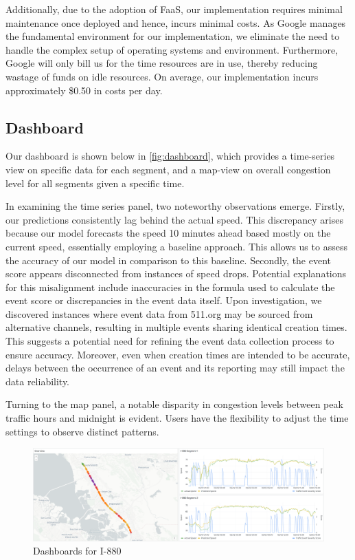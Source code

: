 Additionally, due to the adoption of FaaS, our implementation requires minimal maintenance once deployed and hence, incurs minimal costs. As Google manages the fundamental environment for our implementation, we eliminate the need to handle the complex setup of operating systems and environment. Furthermore, Google will only bill us for the time resources are in use, thereby reducing wastage of funds on idle resources. On average, our implementation incurs approximately \$0.50 in costs per day.

\subsection{Dashboard}
 Our dashboard is shown below in  \autoref{fig:dashboard}, which provides a time-series view on specific data for each segment, and a map-view on overall congestion level for all segments given a specific time.

In examining the time series panel, two noteworthy observations emerge. Firstly, our predictions consistently lag behind the actual speed. This discrepancy arises because our model forecasts the speed 10 minutes ahead based mostly on the current speed, essentially employing a baseline approach. This allows us to assess the accuracy of our model in comparison to this baseline. Secondly, the event score appears disconnected from instances of speed drops. Potential explanations for this misalignment include inaccuracies in the formula used to calculate the event score or discrepancies in the event data itself. Upon investigation, we discovered instances where event data from 511.org may be sourced from alternative channels, resulting in multiple events sharing identical creation times. This suggests a potential need for refining the event data collection process to ensure accuracy. Moreover, even when creation times are intended to be accurate, delays between the occurrence of an event and its reporting may still impact the data reliability.

Turning to the map panel, a notable disparity in congestion levels between peak traffic hours and midnight is evident. Users have the flexibility to adjust the time settings to observe distinct patterns. 

\begin{figure}
    \centering
    \includegraphics[width=\textwidth]{img/dashboard.png}
    \caption{Dashboards for I-880}
    \label{fig:dashboard}
\end{figure}

